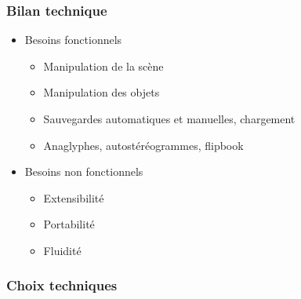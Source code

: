 \documentclass{beamer}
\begin{document}
\begin{frame}
\frametitle{Bilan technique}
\begin{itemize}[label=$\bullet$]
\item Besoins fonctionnels
	\begin{itemize}[label=$\checkmark$]
	\item Manipulation de la scène
	\item Manipulation des objets
	\item Sauvegardes automatiques et manuelles, chargement
	\item Anaglyphes, autostéréogrammes, flipbook
	\end{itemize}
\item Besoins non fonctionnels
	\begin{itemize}[label=$\checkmark$]
	\item Extensibilité
	\item Portabilité  
	\item Fluidité %
	\end{itemize}
\end{itemize}

\end{frame}


\begin{frame}
\frametitle{Choix techniques}

\end{frame}
\end{document}
